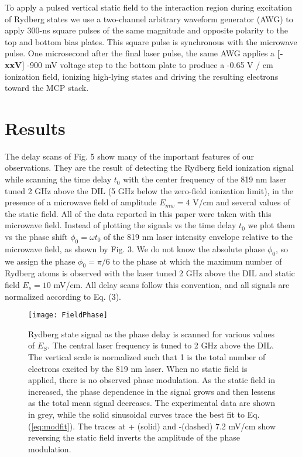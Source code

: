 \documentclass[aps,pra,preprint,groupedaddress]{revtex4-1}
\begin{document}
To apply a pulsed vertical static field to the interaction region during excitation of Rydberg states we use a two-channel arbitrary waveform generator (AWG) to apply 300-ns square pulses of the same magnitude and opposite polarity to the top and bottom bias plates. This square pulse is synchronous with the microwave pulse. One microsecond after the final laser pulse, the same AWG applies a \textbf{[-xxV]} -900 mV voltage step to the bottom plate to produce a -0.65 V / cm ionization field, ionizing high-lying states and driving the resulting electrons toward the MCP stack.


\section{\label{results} Results}


The delay scans of Fig. 5 show many of the important features of our observations. They are the result of detecting the Rydberg field ionization signal while scanning the time delay $t_0$ with the center frequency of the 819 nm laser tuned 2 GHz above the DIL (5 GHz below the zero-field ionization limit), in the presence of a microwave field of amplitude $E_{mw}=4$ V/cm and several values of the static field. All of the data reported in this paper were taken with this microwave field. Instead of plotting the signals vs the time delay $t_0$ we plot them vs the phase shift $\phi_0=\omega t_0$ of the 819 nm laser intensity envelope relative to the microwave field, as shown by Fig. 3. We do not know the absolute phase $\phi_0$, so we assign the phase $\phi_0=\pi/6$ to the phase at which the maximum number of Rydberg atoms is observed with the laser tuned 2 GHz above the DIL and static field $E_s=10$ mV/cm. All delay scans follow this convention, and all signals are normalized according to Eq. (3).


\begin{figure}
	\texttt{[image: FieldPhase]}
	\caption{Rydberg state signal as the phase delay is scanned for various values of $E_S$. The central laser frequency is tuned to 2 GHz above the DIL. The vertical scale is normalized such that 1 is the total number of electrons excited by the 819 nm laser. When no static field is applied, there is no observed phase modulation. As the static field in increased, the phase dependence in the signal grows and then lessens as the total mean signal decreases. The experimental data are shown in grey, while the solid sinusoidal curves trace the best fit to Eq. (\ref{eq:modfit}). The traces at + (solid) and -(dashed) 7.2 mV/cm show reversing the static field inverts the amplitude of the phase modulation.}
	\label{fig:fph}
\end{figure}
\end{document}

